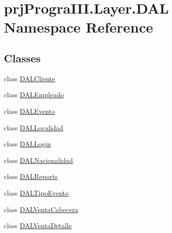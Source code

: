 \hypertarget{namespaceprj_progra_i_i_i_1_1_layer_1_1_d_a_l}{}\section{prj\+Progra\+I\+I\+I.\+Layer.\+D\+AL Namespace Reference}
\label{namespaceprj_progra_i_i_i_1_1_layer_1_1_d_a_l}
\subsection*{Classes}
\begin{DoxyCompactItemize}
\item 
class \hyperlink{classprj_progra_i_i_i_1_1_layer_1_1_d_a_l_1_1_d_a_l_cliente}{D\+A\+L\+Cliente}
\item 
class \hyperlink{classprj_progra_i_i_i_1_1_layer_1_1_d_a_l_1_1_d_a_l_empleado}{D\+A\+L\+Empleado}
\item 
class \hyperlink{classprj_progra_i_i_i_1_1_layer_1_1_d_a_l_1_1_d_a_l_evento}{D\+A\+L\+Evento}
\item 
class \hyperlink{classprj_progra_i_i_i_1_1_layer_1_1_d_a_l_1_1_d_a_l_localidad}{D\+A\+L\+Localidad}
\item 
class \hyperlink{classprj_progra_i_i_i_1_1_layer_1_1_d_a_l_1_1_d_a_l_login}{D\+A\+L\+Login}
\item 
class \hyperlink{classprj_progra_i_i_i_1_1_layer_1_1_d_a_l_1_1_d_a_l_nacionalidad}{D\+A\+L\+Nacionalidad}
\item 
class \hyperlink{classprj_progra_i_i_i_1_1_layer_1_1_d_a_l_1_1_d_a_l_reports}{D\+A\+L\+Reports}
\item 
class \hyperlink{classprj_progra_i_i_i_1_1_layer_1_1_d_a_l_1_1_d_a_l_tipo_evento}{D\+A\+L\+Tipo\+Evento}
\item 
class \hyperlink{classprj_progra_i_i_i_1_1_layer_1_1_d_a_l_1_1_d_a_l_venta_cabecera}{D\+A\+L\+Venta\+Cabecera}
\item 
class \hyperlink{classprj_progra_i_i_i_1_1_layer_1_1_d_a_l_1_1_d_a_l_venta_detalle}{D\+A\+L\+Venta\+Detalle}
\end{DoxyCompactItemize}

